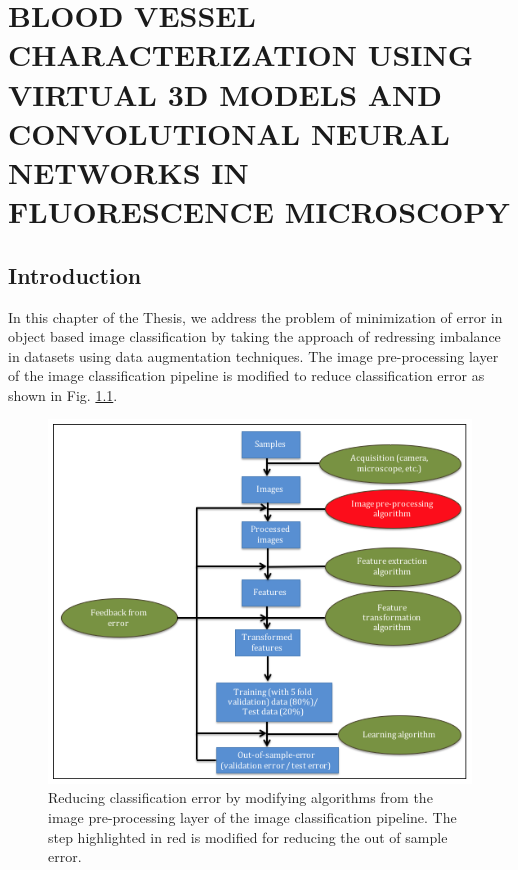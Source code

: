 \chapter{BLOOD VESSEL CHARACTERIZATION USING VIRTUAL 3D MODELS AND CONVOLUTIONAL NEURAL NETWORKS IN FLUORESCENCE MICROSCOPY}
\label{chap:ISBI}

\let\thefootnote\relax{}

\section{Introduction}

In this chapter of the Thesis, we address the problem of minimization of error in object based image classification by taking the approach of redressing imbalance in datasets using data augmentation techniques. The image pre-processing layer of the image classification pipeline is modified to reduce classification error as shown in Fig. \ref{fig:chapter2}.

\begin{figure}[ht!]
\centering
\includegraphics[width=1.0\textwidth]{img/chapter2}
\caption{Reducing classification error by modifying algorithms from the image pre-processing layer of the image classification pipeline. The step highlighted in red is modified for reducing the out of sample error.}
\label{fig:chapter2}
\end{figure}

